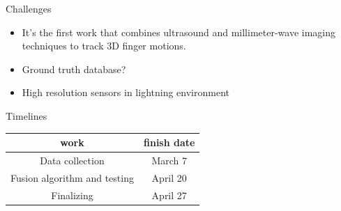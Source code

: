 \documentclass[dvipsnames, handout]{beamer}
\newcommand{\1}{\mathds{1}}	%
\begin{document}
\begin{frame}[t]{Challenges}
\begin{itemize}
\item It's the first work that combines ultrasound and millimeter-wave imaging techniques to track 3D finger motions.
\item Ground truth database?
\item High resolution sensors in lightning environment
\end{itemize}
\end{frame}

\begin{frame}[t]{Timelines}

\begin{center}
\begin{tabular}{|c|c|}
\hline
work  & finish date \\
\hline
\hline
{\tiny Data collection} & {\tiny March 7}\\
\hline
 {\tiny Fusion algorithm and testing } & {\tiny April 20}\\
\hline 
{\tiny Finalizing} & {\tiny April 27} \\
\hline
\end{tabular}
\end{center}

\end{frame}








\end{document}
